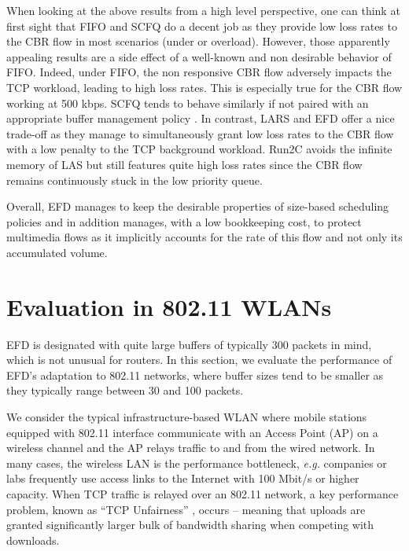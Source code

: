 \documentclass[preprint,12pt]{elsarticle}
\begin{document}
When looking at the above results from a high level perspective, one can think at first sight that FIFO and SCFQ do a decent job as they provide low loss rates to the CBR flow in most scenarios (under or overload). However, those apparently appealing results are a side effect of a well-known and non desirable behavior of FIFO. Indeed, under FIFO, the non responsive CBR flow adversely impacts the TCP workload, leading to high loss rates. This is especially true for the CBR flow working at 500 kbps. SCFQ tends to behave similarly if  not paired with an appropriate buffer management policy \cite{Golestani94SCFQ}. In contrast, LARS and EFD offer a nice trade-off as they manage to simultaneously grant  low loss rates to the CBR flow with a low penalty to the TCP background workload. Run2C avoids the  infinite memory of LAS but still features quite high loss rates since the CBR flow remains continuously stuck in the low priority queue.


Overall, EFD manages to keep the desirable properties of size-based scheduling policies and in addition manages, with a low bookkeeping cost, to protect multimedia flows as it  implicitly accounts for the rate of this flow and not only its accumulated volume. 


\section{Evaluation in 802.11 WLANs}
\label{sec:perf_wlan}
EFD is designated with quite large buffers of typically 300 packets in mind, which is not unusual for routers. In this section, we evaluate the performance of EFD's adaptation to 802.11 networks, where buffer sizes tend to be smaller as they typically range between 30 and 100 packets. 

We consider the typical infrastructure-based WLAN where mobile stations equipped with 802.11 interface communicate with an Access Point (AP) on a wireless channel and the AP relays traffic to and from the wired network. In many cases,  the wireless LAN is the performance bottleneck, \textit{e.g.} companies or labs frequently use access links to the Internet with 100 Mbit/s or higher  capacity. When TCP traffic is relayed over an 802.11 network, a key performance problem, known as ``TCP Unfairness'' \cite{Pilosof03understandingtcp}, occurs -- meaning that uploads are granted significantly larger bulk of bandwidth sharing when competing with downloads. 
\end{document}
